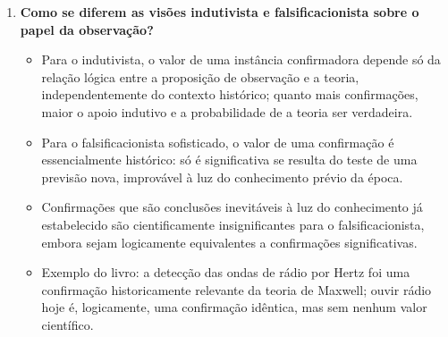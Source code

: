\documentclass[10pt,a4paper]{extarticle}
\begin{document}
\begin{enumerate}[resume, label=\textbf{\arabic*.}, itemsep=10pt]
\item \textbf{Como se diferem as visões indutivista e falsificacionista sobre o papel da observação?}
\begin{itemize}
  \item Para o indutivista, o valor de uma instância confirmadora depende só da relação lógica entre a proposição de observação e a teoria, independentemente do contexto histórico; quanto mais confirmações, maior o apoio indutivo e a probabilidade de a teoria ser verdadeira.
  \item Para o falsificacionista sofisticado, o valor de uma confirmação é essencialmente histórico: só é significativa se resulta do teste de uma previsão nova, improvável à luz do conhecimento prévio da época.
  \item Confirmações que são conclusões inevitáveis à luz do conhecimento já estabelecido são cientificamente insignificantes para o falsificacionista, embora sejam logicamente equivalentes a confirmações significativas.
  \item Exemplo do livro: a detecção das ondas de rádio por Hertz foi uma confirmação historicamente relevante da teoria de Maxwell; ouvir rádio hoje é, logicamente, uma confirmação idêntica, mas sem nenhum valor científico.
\end{itemize}

\end{enumerate}
\end{document}
